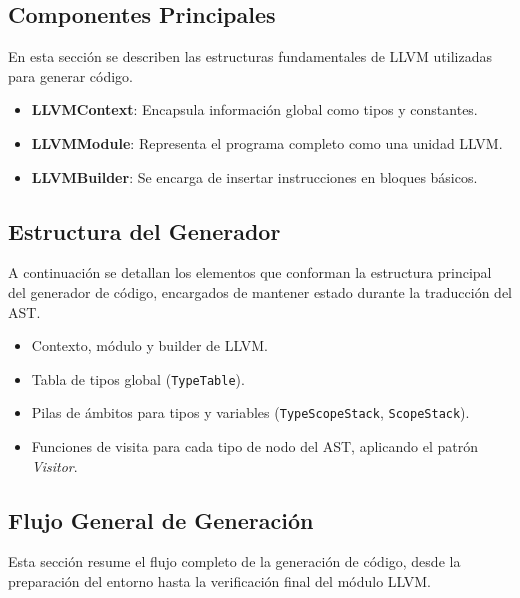 \documentclass[11pt, a4paper, twoside]{article} %
\begin{document}
\subsection{Componentes Principales}

En esta sección se describen las estructuras fundamentales de LLVM utilizadas para generar código.

\begin{itemize}
    \item \textbf{LLVMContext}: Encapsula información global como tipos y constantes.
    \item \textbf{LLVMModule}: Representa el programa completo como una unidad LLVM.
    \item \textbf{LLVMBuilder}: Se encarga de insertar instrucciones en bloques básicos.
\end{itemize}

\subsection{Estructura del Generador}

A continuación se detallan los elementos que conforman la estructura principal del generador de código, encargados de mantener estado durante la traducción del AST.

\begin{itemize}
    \item Contexto, módulo y builder de LLVM.
    \item Tabla de tipos global (\texttt{TypeTable}).
    \item Pilas de ámbitos para tipos y variables (\texttt{TypeScopeStack}, \texttt{ScopeStack}).
    \item Funciones de visita para cada tipo de nodo del AST, aplicando el patrón \textit{Visitor}.
\end{itemize}

\subsection{Flujo General de Generación}

Esta sección resume el flujo completo de la generación de código, desde la preparación del entorno hasta la verificación final del módulo LLVM.
\end{document}
